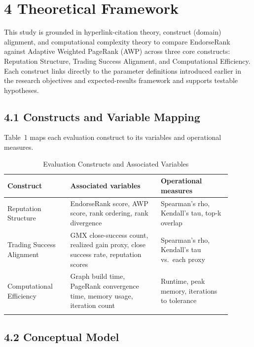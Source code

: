 \clearpage
{}
\section*{4 \textbf{Theoretical Framework}}
\label{sec:theoretical-framework}

This study is grounded in hyperlink-citation theory, construct (domain) alignment, and computational complexity theory to compare EndorseRank against Adaptive Weighted PageRank (AWP) across three core constructs: Reputation Structure, Trading Success Alignment, and Computational Efficiency. Each construct links directly to the parameter definitions introduced earlier in the research objectives and expected-results framework and supports testable hypotheses.


\subsection*{4.1 Constructs and Variable Mapping}
\label{sec:constructs-and-variable-mapping}

Table~1 maps each evaluation construct to its variables and operational measures.

\begin{longtable}{>{\raggedright\arraybackslash}p{0.25\linewidth}>{\raggedright\arraybackslash}p{0.36\linewidth}>{\raggedright\arraybackslash}p{0.29\linewidth}}
\caption{Evaluation Constructs and Associated Variables}\\
\toprule
\textbf{Construct} & \textbf{Associated variables} & \textbf{Operational measures} \\
\midrule
Reputation Structure & EndorseRank score, AWP score, rank ordering, rank divergence & Spearman's rho, Kendall's tau, top-k overlap \\
\addlinespace
Trading Success Alignment & GMX close-success count, realized gain proxy, close success rate, reputation scores & Spearman's rho, Kendall's tau vs.\ each proxy \\
\addlinespace
Computational Efficiency & Graph build time, PageRank convergence time, memory usage, iteration count & Runtime, peak memory, iterations to tolerance \\
\addlinespace
\bottomrule
\end{longtable}

\subsection*{4.2 Conceptual Model}
\label{sec:conceptual-model}

